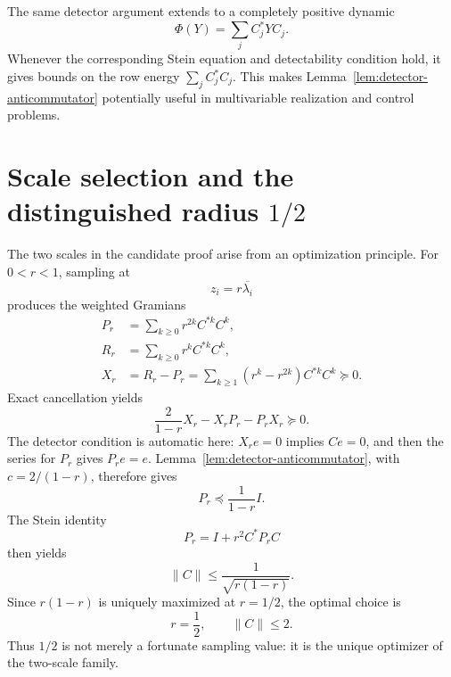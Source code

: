 \documentclass[11pt]{article}
\begin{document}
The same detector argument extends to a completely positive dynamic
\begin{equation}
 \Phi(Y)=\sum_j C_j^*YC_j.
 \label{eq:CP-dynamic}
\end{equation}
Whenever the corresponding Stein equation and detectability
condition hold, it gives bounds on the row energy
\(\sum_jC_j^*C_j\).  This makes
Lemma~\ref{lem:detector-anticommutator} potentially useful in
multivariable realization and control problems.

\section{Scale selection and the distinguished radius
\texorpdfstring{$1/2$}{1/2}}

The two scales in the candidate proof arise from an optimization
principle.  For $0<r<1$, sampling at
\begin{equation}
 z_i=r\overline{\lambda_i}
 \label{eq:r-sampling}
\end{equation}
produces the weighted Gramians
\begin{align}
 P_r&=\sum_{k\geq0}r^{2k}C^{*k}C^k,
 \label{eq:Pr}\\
 R_r&=\sum_{k\geq0}r^kC^{*k}C^k,
 \label{eq:Rr}\\
 X_r&=R_r-P_r
 =\sum_{k\geq1}(r^k-r^{2k})C^{*k}C^k\succeq0.
 \label{eq:Xr}
\end{align}
Exact cancellation yields
\begin{equation}
 \frac{2}{1-r}X_r-X_rP_r-P_rX_r\succeq0.
 \label{eq:r-anticommutator}
\end{equation}
The detector condition is automatic here: $X_re=0$ implies
$Ce=0$, and then the series for $P_r$ gives $P_re=e$.
Lemma~\ref{lem:detector-anticommutator}, with
\(c=2/(1-r)\), therefore gives
\begin{equation}
 P_r\preceq\frac1{1-r}I.
 \label{eq:Pr-bound}
\end{equation}
The Stein identity
\begin{equation}
 P_r=I+r^2C^*P_rC
 \label{eq:Pr-Stein}
\end{equation}
then yields
\begin{equation}
 \|C\|\leq\frac1{\sqrt{r(1-r)}}.
 \label{eq:r-norm-bound}
\end{equation}
Since $r(1-r)$ is uniquely maximized at $r=1/2$, the optimal
choice is
\begin{equation}
 r=\frac12,
 \qquad \|C\|\leq2.
 \label{eq:optimal-radius}
\end{equation}
Thus $1/2$ is not merely a fortunate sampling value: it is the
unique optimizer of the two-scale family.
\end{document}
